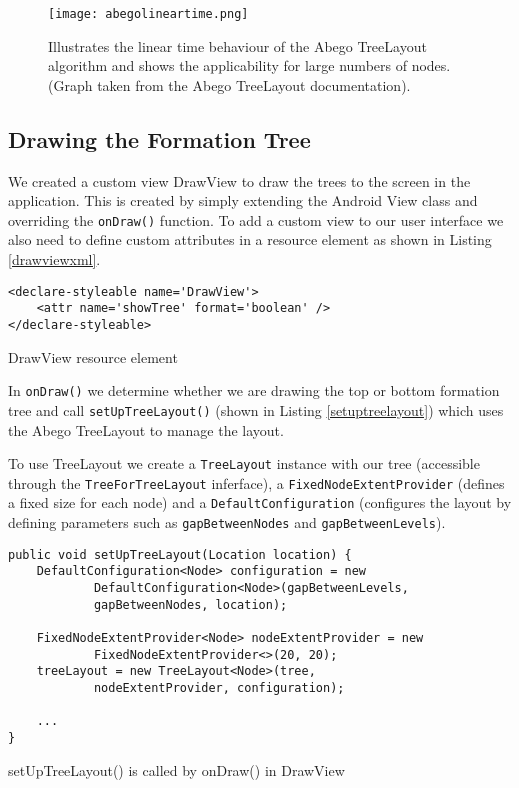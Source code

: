 \documentclass{report}
\begin{document}
\begin{figure}[ht]
    \centering
    \texttt{[image: abegolineartime.png]}
    \caption{Illustrates the linear time behaviour of the Abego TreeLayout algorithm\cite{abegolineartime} and shows the applicability for large numbers of nodes. (Graph taken from the Abego TreeLayout documentation).}
    \label{abegolineartime}
\end{figure}

\subsection{Drawing the Formation Tree}

We created a custom view DrawView to draw the trees to the screen in the application. This is created by simply extending the Android View class and overriding the {\tt onDraw()} function. To add a custom view to our user interface we also need to define custom attributes in a resource element as shown in Listing \ref{drawviewxml}.

\begin{listing}[ht]
\begin{verbatim}
<declare-styleable name='DrawView'>
    <attr name='showTree' format='boolean' />
</declare-styleable>
\end{verbatim}
\caption{DrawView resource element}
\label{drawviewxml}
\end{listing}

In {\tt onDraw()} we determine whether we are drawing the top or bottom formation tree and call {\tt setUpTreeLayout()} (shown in Listing \ref{setuptreelayout}) which uses the Abego TreeLayout to manage the layout.

To use TreeLayout we create a {\tt TreeLayout} instance with our tree (accessible through the {\tt TreeForTreeLayout} inferface), a {\tt FixedNodeExtentProvider} (defines a fixed size for each node) and a {\tt DefaultConfiguration} (configures the layout by defining parameters such as {\tt gapBetweenNodes} and {\tt gapBetweenLevels}).

\begin{listing}[ht]
\begin{verbatim}
public void setUpTreeLayout(Location location) {
    DefaultConfiguration<Node> configuration = new 
            DefaultConfiguration<Node>(gapBetweenLevels, 
            gapBetweenNodes, location);

    FixedNodeExtentProvider<Node> nodeExtentProvider = new 
            FixedNodeExtentProvider<>(20, 20);
    treeLayout = new TreeLayout<Node>(tree,
            nodeExtentProvider, configuration);

    ...
}
\end{verbatim}
\caption{setUpTreeLayout() is called by onDraw() in DrawView}
\label{setuptreelayout}
\end{listing}
\end{document}
